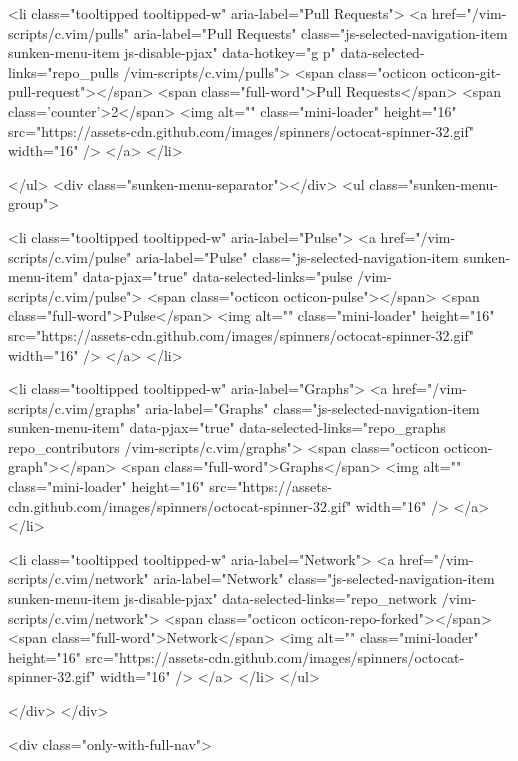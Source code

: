       <li class="tooltipped tooltipped-w" aria-label="Pull Requests">
        <a href="/vim-scripts/c.vim/pulls" aria-label="Pull Requests" class="js-selected-navigation-item sunken-menu-item js-disable-pjax" data-hotkey="g p" data-selected-links="repo_pulls /vim-scripts/c.vim/pulls">
            <span class="octicon octicon-git-pull-request"></span> <span class="full-word">Pull Requests</span>
            <span class='counter'>2</span>
            <img alt="" class="mini-loader" height="16" src="https://assets-cdn.github.com/images/spinners/octocat-spinner-32.gif" width="16" />
</a>      </li>


    </ul>
    <div class="sunken-menu-separator"></div>
    <ul class="sunken-menu-group">

      <li class="tooltipped tooltipped-w" aria-label="Pulse">
        <a href="/vim-scripts/c.vim/pulse" aria-label="Pulse" class="js-selected-navigation-item sunken-menu-item" data-pjax="true" data-selected-links="pulse /vim-scripts/c.vim/pulse">
          <span class="octicon octicon-pulse"></span> <span class="full-word">Pulse</span>
          <img alt="" class="mini-loader" height="16" src="https://assets-cdn.github.com/images/spinners/octocat-spinner-32.gif" width="16" />
</a>      </li>

      <li class="tooltipped tooltipped-w" aria-label="Graphs">
        <a href="/vim-scripts/c.vim/graphs" aria-label="Graphs" class="js-selected-navigation-item sunken-menu-item" data-pjax="true" data-selected-links="repo_graphs repo_contributors /vim-scripts/c.vim/graphs">
          <span class="octicon octicon-graph"></span> <span class="full-word">Graphs</span>
          <img alt="" class="mini-loader" height="16" src="https://assets-cdn.github.com/images/spinners/octocat-spinner-32.gif" width="16" />
</a>      </li>

      <li class="tooltipped tooltipped-w" aria-label="Network">
        <a href="/vim-scripts/c.vim/network" aria-label="Network" class="js-selected-navigation-item sunken-menu-item js-disable-pjax" data-selected-links="repo_network /vim-scripts/c.vim/network">
          <span class="octicon octicon-repo-forked"></span> <span class="full-word">Network</span>
          <img alt="" class="mini-loader" height="16" src="https://assets-cdn.github.com/images/spinners/octocat-spinner-32.gif" width="16" />
</a>      </li>
    </ul>


  </div>
</div>

              <div class="only-with-full-nav">
                

